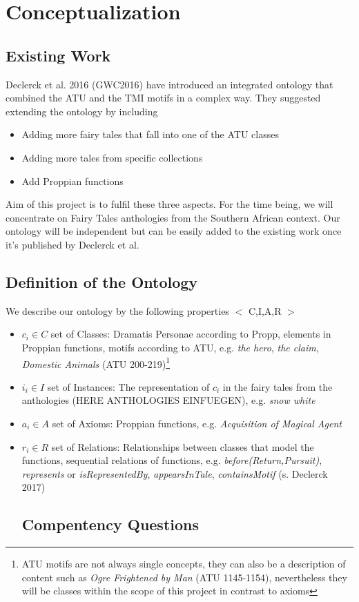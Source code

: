 \documentclass[10pt,a4paper]{article}
\begin{document}
\section{Conceptualization}
	\subsection{Existing Work} 
	Declerck et al. 2016 (GWC2016) have introduced an integrated ontology that combined the ATU and the TMI motifs in a complex way. They suggested extending the ontology by including 
	
	\begin{itemize}
		\item Adding more fairy tales that fall into one of the ATU classes
		\item Adding more tales from specific collections
		\item Add Proppian functions
		
	\end{itemize}	  
	
	Aim of this project is to fulfil these three aspects. For the time being, we will concentrate on Fairy Tales anthologies from the Southern African context. Our ontology will be independent but can be easily added to the existing work once it's published by Declerck et al. 
	\subsection{Definition of the Ontology} 
	We describe our ontology by the following properties $<$ C,I,A,R $>$

\begin{itemize}
	
	\item $c_{i} \in C $ set of Classes: Dramatis Personae according to Propp, elements in Proppian functions, motifs according to ATU, e.g. \textit{the hero}, \textit{the claim},       \textit{Domestic Animals} (ATU 200-219)\footnote{ATU motifs are not always single concepts, they can also be a description of content such as \textit{Ogre Frightened by Man} (ATU 1145-1154), nevertheless they will be classes within the scope of this project in contrast to axioms}
	\item $i_{i} \in I $ set of Instances: The representation of $c_{i}$ in the fairy tales from the anthologies (HERE ANTHOLOGIES EINFUEGEN), e.g. \textit{snow white} 
	\item $a_{i} \in A$  set of Axioms: Proppian functions, e.g. \textit{Acquisition of Magical Agent} 
	\item $r_{i} \in R $ set of Relations: Relationships between classes that model the functions, sequential relations of functions, e.g. \textit{before(Return,Pursuit)}, \textit{represents} or \textit{isRepresentedBy}, \textit{appearsInTale}, \textit{containsMotif} (s. Declerck 2017)
	 
	 
	 \subsection{Compentency Questions} 
\end{itemize}
\end{document}
